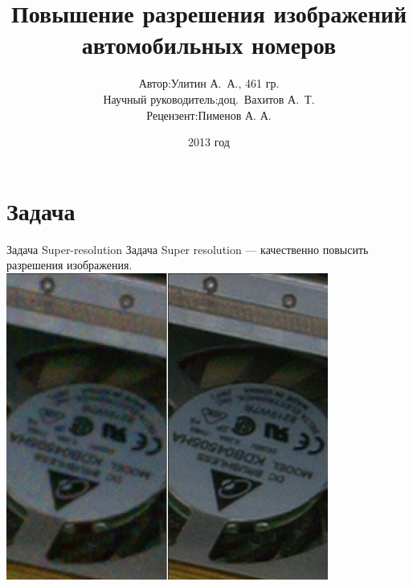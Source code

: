 \title{Повышение разрешения изображений автомобильных номеров}
\author{
  \begin{tabular}[4cm]{rl}
 Автор:                & Улитин А.~А., 461 гр. \\
 Научный руководитель: & доц.~Вахитов А.~Т. \\
 Рецензент: & Пименов А. А. \\
 \end{tabular}
 }
\date{2013 год}

\begin{frame}{}
		\maketitle
\end{frame}

\section{Задача}
\begin{frame}{Задача Super-resolution}
  Задача Super resolution --- качественно повысить разрешения изображения.
  \includegraphics[height=\textheight]{content/An_example_of_super_resolution_with_still_RAW_photo.jpg}
\end{frame}

